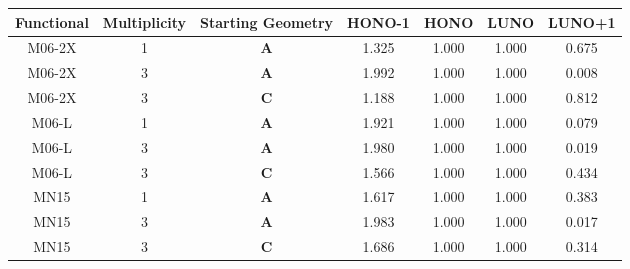 \begin{tabular}{ccccccc}
\toprule
Functional & Multiplicity & Starting Geometry &  HONO-1 &  HONO &  LUNO &  LUNO+1 \\
\midrule
    M06-2X &            1 &        \textbf{A} &   1.325 & 1.000 & 1.000 &   0.675 \\
    M06-2X &            3 &        \textbf{A} &   1.992 & 1.000 & 1.000 &   0.008 \\
    M06-2X &            3 &        \textbf{C} &   1.188 & 1.000 & 1.000 &   0.812 \\
     M06-L &            1 &        \textbf{A} &   1.921 & 1.000 & 1.000 &   0.079 \\
     M06-L &            3 &        \textbf{A} &   1.980 & 1.000 & 1.000 &   0.019 \\
     M06-L &            3 &        \textbf{C} &   1.566 & 1.000 & 1.000 &   0.434 \\
      MN15 &            1 &        \textbf{A} &   1.617 & 1.000 & 1.000 &   0.383 \\
      MN15 &            3 &        \textbf{A} &   1.983 & 1.000 & 1.000 &   0.017 \\
      MN15 &            3 &        \textbf{C} &   1.686 & 1.000 & 1.000 &   0.314 \\
\bottomrule
\end{tabular}
